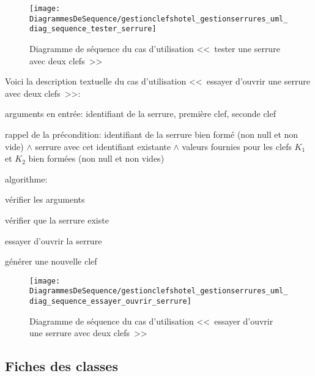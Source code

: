 \documentclass[11pt,article]{article}
\newcommand{\nullvalue}{\textsf{null}\xspace}
\begin{document}
\begin{figure}[ht!]
\begin{center}
\texttt{[image: DiagrammesDeSequence/gestionclefshotel\_gestionserrures\_uml\_diag\_sequence\_tester\_serrure]}
\caption{Diagramme de séquence du cas d'utilisation <<~tester une
  serrure avec deux clefs~>>}
\end{center}
\label{umlet_diag_sequence_tester_serrure}
\end{figure}

\newpage

Voici la description textuelle du cas d'utilisation <<~essayer
d'ouvrir une serrure avec deux clefs~>>:
\begin{compactitem}
\item arguments en entrée: identifiant de la serrure, première clef,
  seconde clef
\item rappel de la précondition: identifiant de la serrure bien formé
  (non \nullvalue et non vide) $\land$ serrure avec cet identifiant
  existante $\land$ valeurs fournies pour les clefs $K_1$ et $K_2$
  bien formées (non \nullvalue et non vides)
\item algorithme:
\begin{compactenum}
\item vérifier les arguments
\item vérifier que la serrure existe
\item essayer d'ouvrir la serrure
  \begin{compactitem}
  \item générer une nouvelle clef
  \end{compactitem}
\end{compactenum}
\end{compactitem}

\begin{figure}[ht!]
\begin{center}
\texttt{[image: DiagrammesDeSequence/gestionclefshotel\_gestionserrures\_uml\_diag\_sequence\_essayer\_ouvrir\_serrure]}
\caption{Diagramme de séquence du cas d'utilisation <<~essayer d'ouvrir une
  serrure avec deux clefs~>>}
\end{center}
\label{umlet_diag_sequence_essayer_ouvrir_serrure}
\end{figure}

\newpage

\subsection{Fiches des classes}
\end{document}
